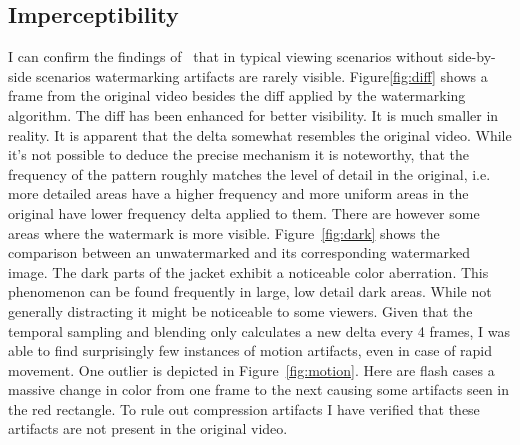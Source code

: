 \documentclass[12pt, technote]{IEEEtran}
\begin{document}
\subsection{Imperceptibility}
I can confirm the findings of~\cite{videoseal} that in typical viewing scenarios without side-by-side scenarios watermarking artifacts are rarely visible. Figure\ref{fig:diff} shows a frame from the original video besides the diff applied by the watermarking algorithm. The diff has been enhanced for better visibility. It is much smaller in reality. It is apparent that the delta somewhat resembles the original video. While it's not possible to deduce the precise mechanism it is noteworthy, that the frequency of the pattern roughly matches the level of detail in the original, i.e. more detailed areas have a higher frequency and more uniform areas in the original have lower frequency delta applied to them. There are however some areas where the watermark is more visible. Figure~\ref{fig:dark} shows the comparison between an unwatermarked and its corresponding watermarked image. The dark parts of the jacket exhibit a noticeable color aberration. This phenomenon can be found frequently in large, low detail dark areas. While not generally distracting it might be noticeable to some viewers. Given that the temporal sampling and blending only calculates a new delta every 4 frames, I was able to find surprisingly few instances of motion artifacts, even in case of rapid movement. One outlier is depicted in Figure~\ref{fig:motion}. Here are flash cases a massive change in color from one frame to the next causing some artifacts seen in the red rectangle. To rule out compression artifacts I have verified that these artifacts are not present in the original video.
\end{document}
